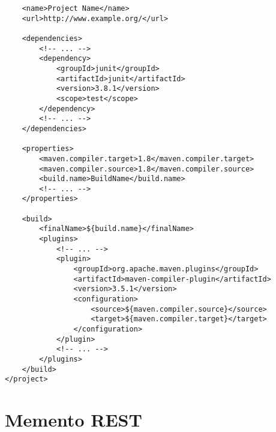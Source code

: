 \documentclass[11pt,twoside,a4paper]{article}
\begin{document}
\begin{landscape}
\begin{multicols}{2}
\begin{verbatim}
    <name>Project Name</name>
    <url>http://www.example.org/</url>
    
    <dependencies>
        <!-- ... -->
        <dependency>
            <groupId>junit</groupId>
            <artifactId>junit</artifactId>
            <version>3.8.1</version>
            <scope>test</scope>
        </dependency>
        <!-- ... -->
    </dependencies>
    
    <properties>
        <maven.compiler.target>1.8</maven.compiler.target>
        <maven.compiler.source>1.8</maven.compiler.source>
        <build.name>BuildName</build.name>
        <!-- ... -->
    </properties>
    
    <build>
        <finalName>${build.name}</finalName>
        <plugins>
            <!-- ... -->
            <plugin>
                <groupId>org.apache.maven.plugins</groupId>
                <artifactId>maven-compiler-plugin</artifactId>
                <version>3.5.1</version>
                <configuration>
                    <source>${maven.compiler.source}</source>
                    <target>${maven.compiler.target}</target>
                </configuration>
            </plugin>
            <!-- ... -->
        </plugins>
    </build>
</project>
	\end{verbatim}
	\normalsize
	
	\vfill
	\columnbreak
	
	\section*{Memento REST}
	

\end{multicols}
\end{landscape}
\end{document}
